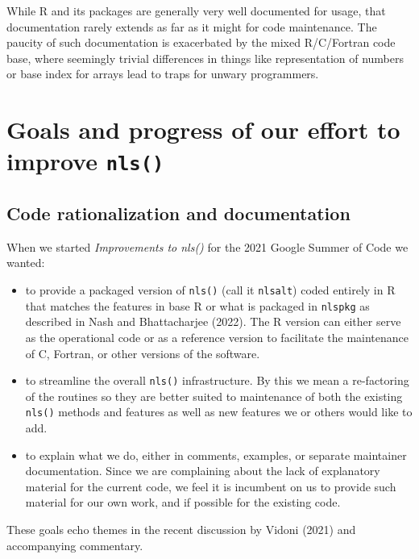 While R and its packages are generally very well documented for usage, that
documentation rarely extends as far as it might for code maintenance.
The paucity of such documentation is exacerbated by the mixed R/C/Fortran code base,
where seemingly trivial differences in things like representation of numbers or
base index for arrays lead to traps for unwary programmers.

\hypertarget{goals-and-progress-of-our-effort-to-improve-nls}{%
\section{\texorpdfstring{Goals and progress of our effort to improve \texttt{nls()}}{Goals and progress of our effort to improve nls()}}\label{goals-and-progress-of-our-effort-to-improve-nls}}

\hypertarget{code-rationalization-and-documentation}{%
\subsection{Code rationalization and documentation}\label{code-rationalization-and-documentation}}

When we started \emph{Improvements to nls()} for the 2021 Google Summer of Code we wanted:

\begin{itemize}
\item
  to provide a packaged version of \texttt{nls()} (call it \texttt{nlsalt}) coded entirely in R
  that matches the features in base R or what is packaged in \texttt{nlspkg} as described
  in Nash and Bhattacharjee (2022). The R version can either serve as the operational code or
  as a reference version to facilitate the maintenance of C, Fortran, or other
  versions of the software.
\item
  to streamline the overall \texttt{nls()} infrastructure. By this we
  mean a re-factoring of the routines so they are better suited to maintenance of both
  the existing \texttt{nls()} methods and features as well as new features we or others
  would like to add.
\item
  to explain what we do, either in comments, examples, or separate maintainer
  documentation. Since we are complaining about the lack of explanatory material
  for the current code, we feel it is incumbent on us to provide such material
  for our own work, and if possible for the existing code.
\end{itemize}

These goals echo themes in the recent discussion by Vidoni (2021) and accompanying
commentary.

